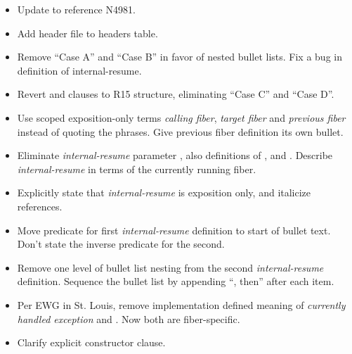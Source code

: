 \begin{itemize}
    \item Update to reference N4981.
    \item Add  header file to headers table.
    \item Remove \resumewith ``Case A'' and ``Case B'' in favor of
          nested bullet lists. Fix a bug in definition of internal-resume.
    \item Revert \resumewith\xspace\returns and \except clauses to R15
          structure, eliminating ``Case C'' and ``Case D''.
    \item Use scoped exposition-only terms \emph{calling fiber}, \emph{target
          fiber} and \emph{previous fiber} instead of quoting the phrases.
          Give previous fiber definition its own bullet.
    \item Eliminate \emph{internal-resume} parameter , also
          definitions of , 
          and . Describe \emph{internal-resume} in
          terms of the currently running fiber.
    \item Explicitly state that \emph{internal-resume} is exposition only, and
          italicize references.
    \item Move predicate for first \emph{internal-resume} definition to start
          of bullet text. Don't state the inverse predicate for the second.
    \item Remove one level of bullet list nesting from the
          second \emph{internal-resume} definition. Sequence the bullet list
          by appending ``, then'' after each item.
    \item Per EWG in St. Louis, remove implementation defined meaning
          of \emph{currently handled exception} and .
          Now both are fiber-specific.
    \item Clarify explicit constructor \except clause.
\end{itemize}


